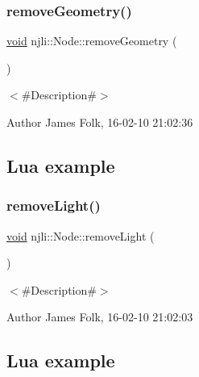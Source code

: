 \begin{DoxyCodeInclude}
\end{DoxyCodeInclude}
\mbox{\label{classnjli_1_1_node_aecc02091c34df61214802b8da38031a5}} 
\subsubsection{\texorpdfstring{remove\+Geometry()}{removeGeometry()}}
{\footnotesize\ttfamily \mbox{\hyperlink{_thread_8h_af1e856da2e658414cb2456cb6f7ebc66}{void}} njli\+::\+Node\+::remove\+Geometry (\begin{DoxyParamCaption}{ }\end{DoxyParamCaption})}



$<$\#\+Description\#$>$ 

\begin{DoxyAuthor}{Author}
James Folk, 16-\/02-\/10 21\+:02\+:36
\end{DoxyAuthor}
\hypertarget{classnjli_1_1_steering_behavior_wander_ex1}{}\subsection{Lua example}\label{classnjli_1_1_steering_behavior_wander_ex1}

\begin{DoxyCodeInclude}
\end{DoxyCodeInclude}
\mbox{\label{classnjli_1_1_node_a08a26531ce5304da2b57592c8c2ba5e5}} 
\subsubsection{\texorpdfstring{remove\+Light()}{removeLight()}}
{\footnotesize\ttfamily \mbox{\hyperlink{_thread_8h_af1e856da2e658414cb2456cb6f7ebc66}{void}} njli\+::\+Node\+::remove\+Light (\begin{DoxyParamCaption}{ }\end{DoxyParamCaption})}



$<$\#\+Description\#$>$ 

\begin{DoxyAuthor}{Author}
James Folk, 16-\/02-\/10 21\+:02\+:03
\end{DoxyAuthor}
\hypertarget{classnjli_1_1_steering_behavior_wander_ex1}{}\subsection{Lua example}\label{classnjli_1_1_steering_behavior_wander_ex1}

